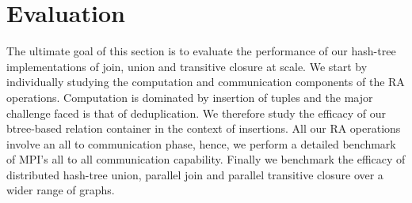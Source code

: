 

\section{Evaluation}
\label{sec:eval}

The ultimate goal of this section is to evaluate the performance of our hash-tree implementations of join, union and transitive closure at scale.
We start by individually studying the computation and communication components of the RA operations.
Computation is dominated by insertion of tuples and the major challenge faced is that of deduplication.
We therefore study the efficacy of our btree-based relation container in the context of insertions.
All our RA operations involve an all to communication phase, hence, we perform a detailed benchmark of MPI's all to all communication capability.
Finally we benchmark the efficacy of distributed hash-tree union, parallel join and parallel transitive closure over a wider range of graphs.



